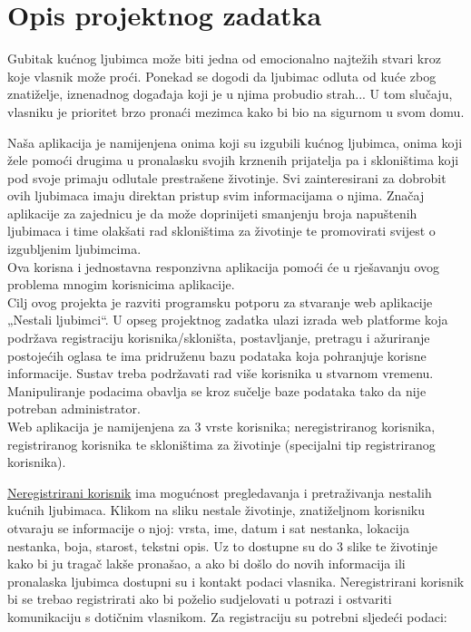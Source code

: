 \chapter{Opis projektnog zadatka}

		Gubitak kućnog ljubimca može biti jedna od emocionalno najtežih stvari kroz koje vlasnik može proći. Ponekad se dogodi da ljubimac odluta od kuće zbog znatiželje, iznenadnog događaja koji je u njima probudio strah... U tom slučaju, vlasniku je prioritet brzo pronaći mezimca kako bi bio na sigurnom u svom domu.
		
		Naša aplikacija je namijenjena onima koji su izgubili kućnog ljubimca, onima koji žele pomoći drugima u pronalasku svojih krznenih prijatelja pa i skloništima koji pod svoje primaju odlutale prestrašene životinje. Svi zainteresirani za dobrobit ovih ljubimaca imaju direktan pristup svim informacijama o njima. Značaj aplikacije za zajednicu je da može doprinijeti smanjenju broja napuštenih ljubimaca i time olakšati rad skloništima za životinje te promovirati svijest o izgubljenim ljubimcima. \\
		
		Ova korisna i jednostavna responzivna aplikacija pomoći će u rješavanju ovog problema mnogim korisnicima aplikacije.\\
		
		Cilj ovog projekta je razviti programsku potporu za stvaranje web aplikacije „Nestali ljubimci“. U opseg projektnog zadatka ulazi izrada web platforme koja podržava registraciju korisnika/skloništa, postavljanje, pretragu i ažuriranje postojećih oglasa te ima pridruženu bazu podataka koja pohranjuje korisne informacije. Sustav treba podržavati rad više korisnika u stvarnom vremenu. Manipuliranje podacima obavlja se kroz sučelje baze podataka tako da nije potreban administrator.\\
		
		Web aplikacija je namijenjena za 3 vrste korisnika; neregistriranog korisnika, registriranog korisnika te skloništima za životinje (specijalni tip registriranog korisnika).
		
		\underline{Neregistrirani korisnik} ima mogućnost pregledavanja i pretraživanja nestalih kućnih ljubimaca. Klikom na sliku nestale životinje, znatiželjnom korisniku otvaraju se informacije o njoj: vrsta, ime, datum i sat nestanka, lokacija nestanka, boja, starost, tekstni opis. Uz to dostupne su do 3 slike te životinje kako bi ju tragač lakše pronašao, a ako bi došlo do novih informacija ili pronalaska ljubimca dostupni su i kontakt podaci vlasnika. Neregistrirani korisnik bi se trebao registrirati ako bi poželio sudjelovati u potrazi i ostvariti komunikaciju s dotičnim vlasnikom. Za registraciju su potrebni sljedeći podaci:
		
